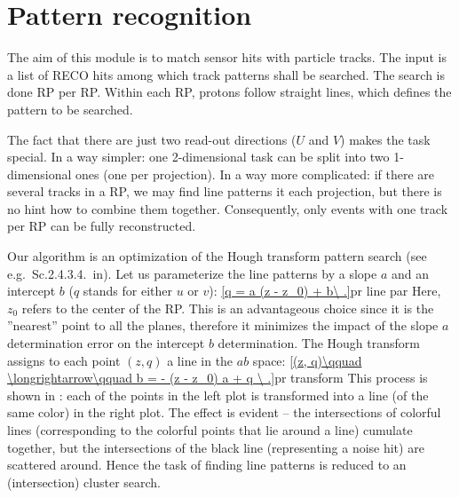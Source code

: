 

\section[pattern reco]{Pattern recognition}

The aim of this module is to match sensor hits with particle tracks. The input is a list of RECO hits among which track patterns shall be searched. The search is done RP per RP. Within each RP, protons follow straight lines, which defines the pattern to be searched.

The fact that there are just two read-out directions ($U$ and $V$) makes the task special. In a way simpler: one 2-dimensional task can be split into two 1-dimensional ones (one per projection). In a way more complicated: if there are several tracks in a RP, we may find line patterns it each projection, but there is no hint how to combine them together. Consequently, only events with one track per RP can be fully reconstructed.

Our algorithm is an optimization of the Hough transform pattern search (see e.g.~Sc.2.4.3.4.~in). Let us parameterize the line patterns by a slope $a$ and an intercept $b$ ($q$ stands for either $u$ or $v$):
\eqref{q = a (z - z_0) + b\ .}{pr line par}
Here, $z_0$ refers to the center of the RP. This is an advantageous choice since it is the ''nearest'' point to all the planes, therefore it minimizes the impact of the slope $a$ determination error on the intercept $b$ determination. The Hough transform assigns to each point $(z, q)$ a line in the $ab$ space:
\eqref{(z, q)\qquad \longrightarrow\qquad b = - (z - z_0) a + q \ .}{pr transform}
This process is shown in : each of the points in the left plot is transformed into a line (of the same color) in the right plot. The effect is evident -- the intersections of colorful lines (corresponding to the colorful points that lie around a line) cumulate together, but the intersections of the black line (representing a noise hit) are scattered around. Hence the task of finding line patterns is reduced to an (intersection) cluster search.

